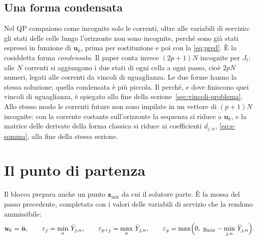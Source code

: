 \documentclass[11pt,a4paper]{article}
\newcommand{\vett}[1]{\boldsymbol{#1}}      %
\begin{document}
\subsection{Una forma condensata}

Nel QP compaiono come incognite solo le correnti, oltre alle variabili di
servizio: gli stati delle celle lungo l'orizzonte non sono incognite, perché
sono già stati espressi in funzione di $\vett{u}_k$, prima per sostituzione e poi con
la \eqref{eq:pred}. È la cosiddetta forma \emph{condensata}. Il paper conta
invece $(2p+1)N$ incognite per $J_t$: alle $N$ correnti si aggiungono i due
stati di ogni cella a ogni passo, cioè $2pN$ numeri, legati alle correnti da
vincoli di uguaglianza. Le due forme hanno la stessa soluzione; quella
condensata è più piccola. Il perché, e dove finiscono quei vincoli di
uguaglianza, è spiegato alla fine della sezione~\ref{sec:vincoli-problema}.
Allo stesso modo le correnti future non sono impilate in un vettore di
$(p+1)N$ incognite: con la corrente costante sull'orizzonte la sequenza si
riduce a $\vett{u}_k$, e la matrice delle derivate della forma classica si riduce ai
coefficienti $d_{j,n}$, \eqref{eq:s-somma}, alla fine della stessa sezione.

\section{Il punto di partenza}\label{sec:partenza}

Il blocco prepara anche un punto $\vett{z}_{\mathrm{iniz}}$ da cui il solutore parte. È la mossa
del passo precedente, completata con i valori delle variabili di servizio che
la rendono ammissibile:
\begin{equation}
  \vett{u}_k = \bar{\vett{u}} , \qquad
  \varepsilon_j = \min_{n}\, \bar Y_{j,n} , \qquad
  \varepsilon_{p+j} = \max_{n}\, \bar Y_{j,n} , \qquad
  \varepsilon_y = \max\Bigl(0,\; y_{\min} - \min_{j,n}\, \bar Y_{j,n}\Bigr) .
  \label{eq:z0}
\end{equation}
\end{document}
